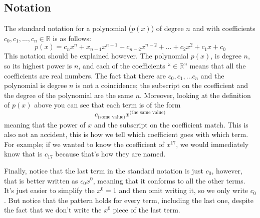 \documentclass{ximera}
\begin{document}
\subsection*{Notation}
\begin{definition}
    The standard notation for a polynomial ($p(x)$) of degree $n$ and with coefficients $c_0, c_1, \dots , c_n \in \mathbb{R}$ is as follows:
    \[
        p(x) = c_nx^n + x_{n-1}x^{n-1} + c_{n-2}x^{n-2} + \dots + c_2x^2 + c_1x + c_0
    \]
    This notation should be explained however. The polynomial $p(x)$, is degree $n$, so its highest power is $n$, and each of the coefficients ``$\in\mathbb{R}$'' means that all the coefficients are real numbers. The fact that there are $c_0, c_1, \dots c_n$ and the polynomial is degree $n$ is not a coincidence; the subscript on the coefficient and the degree of the polynomial are the same $n$. Moreover, looking at the definition of $p(x)$ above you can see that each term is of the form 
    \[
        c_{\text{(some value)}} x^{\text{(the same value)}}
    \]
    meaning that the power of $x$ and the subscript on the coefficient match. This is also not an accident, this is how we tell which coefficient goes with which term. For example; if we wanted to know the coefficient of $x^{17}$, we would immediately know that is $c_{17}$ because that's how they are named.
    
    Finally, notice that the last term in the standard notation is just $c_0$, however, that is better written as $c_0x^0$, meaning that it conforms to all the other terms. It's just easier to simplify the $x^0 = 1$ and then omit writing it, so we only write $c_0$. But notice that the pattern holds for every term, including the last one, despite the fact that we don't write the $x^0$ piece of the last term.
\end{definition}
\end{document}
